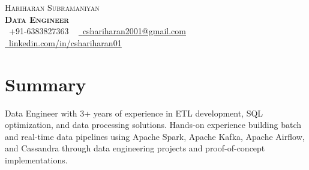 \documentclass[letterpaper,11pt]{article}
\begin{document}
\thispagestyle{fancy}  %

\begin{center}
    {\Huge \scshape Hariharan Subramaniyan} \\ \vspace{4pt}
    \textbf{\Large \scshape Data Engineer} \\ \vspace{4pt}
    \small \faPhone\ +91-6383827363 ~ 
    \href{mailto:cshariharan2001@gmail.com}{\faEnvelope\ \underline{cshariharan2001@gmail.com}} ~ 
    \href{https://www.linkedin.com/in/cshariharan01/}{\faLinkedin\ \underline{linkedin.com/in/cshariharan01}} 
\end{center}

\section{Summary}
Data Engineer with 3+ years of experience in ETL development, SQL optimization, and data processing solutions. Hands-on experience building batch and real-time data pipelines using Apache Spark, Apache Kafka, Apache Airflow, and Cassandra through data engineering projects and proof-of-concept implementations.

\end{document}
